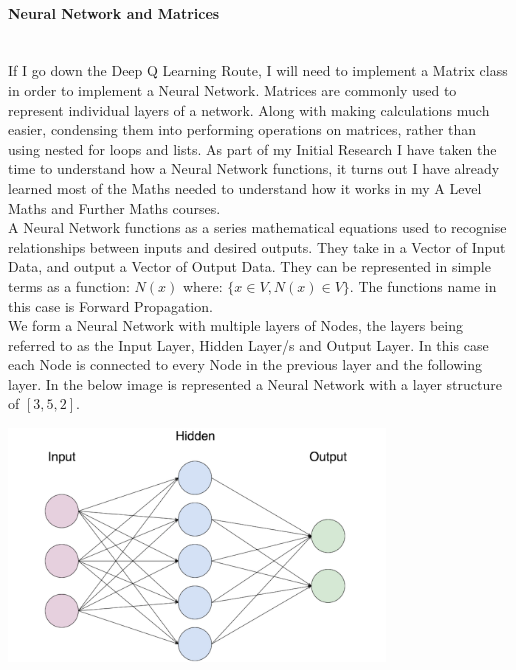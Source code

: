 \begin{flushleft}
                \paragraph{Neural Network and Matrices} \mbox{} \\
                    If I go down the Deep Q Learning Route, I will need to implement a Matrix class in order to
                    implement a Neural Network. Matrices are commonly used to represent individual layers of a network. Along
                    with making calculations much easier, condensing them into performing operations on matrices, rather than
                    using nested for loops and lists. As part of my Initial Research I have taken the time to understand
                    how a Neural Network functions, it turns out I have already learned most of the Maths needed to understand
                    how it works in my A Level Maths and Further Maths courses. \\
                    \vspace{0.2cm}
                    A Neural Network functions as a series mathematical equations used to recognise relationships between inputs
                    and desired outputs. They take in a Vector of Input Data, and output a Vector of Output Data. They can be represented
                    in simple terms as a function: $N(x)$ where: $\{x \in V, N(x) \in V\}$.
                    The functions name in this case is Forward Propagation. \\
                    \vspace{0.2cm}
                    We form a Neural Network with multiple layers of Nodes, the layers being referred to as the Input Layer, 
                    Hidden Layer/s and Output Layer. In this case each Node is connected to every Node in the previous layer and
                    the following layer. In the below image is represented a Neural Network with a layer structure of $[3, 5, 2]$.

                    \vspace{0.1cm}
                    \centerline{\includegraphics[width=10cm]{Images/InitialResearch/NeuralNetworkExample.png}}


\end{flushleft}
